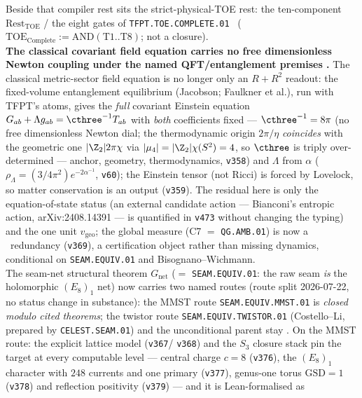 \begin{keybox}
\begin{center}
\end{center}
\noindent Beside that compiler rest sits the strict-physical-TOE rest: the ten-component
$\mathrm{Rest}_{\mathrm{TOE}}$ / the eight gates of \texttt{TFPT.TOE.COMPLETE.01} \mO\
($\mathrm{TOE}_{\mathrm{Complete}}:=\mathrm{AND}(\mathrm{T1}{..}\mathrm{T8})$; not a closure).
\smallskip\\
\noindent\textbf{The classical covariant field equation carries no free dimensionless Newton coupling
under the named QFT/entanglement premises \mC.} The classical metric-sector field equation is no longer only an
$R{+}R^2$ readout: the fixed-volume entanglement equilibrium (Jacobson; Faulkner et al.), run with TFPT's atoms,
gives the \emph{full} covariant Einstein equation $G_{ab}+\Lambda g_{ab}=\cthree^{-1}T_{ab}$ with \emph{both}
coefficients fixed --- $\cthree^{-1}=8\pi$ (no free dimensionless Newton dial; the thermodynamic origin $2\pi/\eta$
\emph{coincides} with the geometric one $|\Z_2|2\pi\chi$ via $|\mu_4|=|\Z_2|\chi(S^2)=4$, so $\cthree$ is triply
over-determined --- anchor, geometry, thermodynamics, \texttt{v358}) and $\Lambda$ from $\alpha$ ($\rho_\Lambda
=(3/4\pi^2)e^{-2\alpha^{-1}}$, \texttt{v60}); the Einstein tensor (not Ricci) is forced by Lovelock, so matter
conservation is an output (\texttt{v359}). The residual here is only the equation-of-state status (an external
candidate action --- Bianconi's entropic action, arXiv:2408.14391 --- is quantified in \texttt{v473} without
changing the typing) and the one unit
$v_{\mathrm{geo}}$; the global measure (C7 $=$ \texttt{QG.AMB.01}) is now a \mC\ redundancy (\texttt{v369}), a
certification object rather than missing dynamics, conditional on \texttt{SEAM.EQUIV.01} and Bisognano--Wichmann.
\smallskip\\
\noindent The seam-net structural theorem $G_{\mathrm{net}}$ ($=$ \texttt{SEAM.EQUIV.01}: the raw seam \emph{is} the
holomorphic $(E_8)_1$ net) now carries two named routes (route split 2026-07-22, no status change in substance):
the MMST route \texttt{SEAM.EQUIV.MMST.01} is \emph{closed modulo cited theorems}; the twistor route
\texttt{SEAM.EQUIV.TWISTOR.01} (Costello--Li, prepared by \texttt{CELEST.SEAM.01}) and the unconditional parent
stay \mO. On the MMST route: the explicit lattice model (\texttt{v367}/%
\texttt{v368}) and the $S_3$ closure stack pin the target at every computable level --- central charge $c=8$
(\texttt{v376}), the $(E_8)_1$ character with $248$ currents and one primary (\texttt{v377}), genus-one torus
$\mathrm{GSD}=1$ (\texttt{v378}) and reflection positivity (\texttt{v379}) --- and it is Lean-formalised as

\end{keybox}
